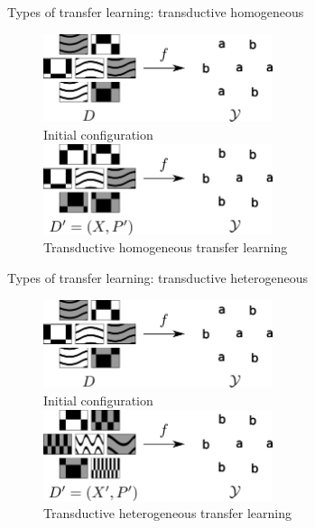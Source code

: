 \documentclass[xcolor=pdftex,dvipsnames,table,mathserif]{beamer}
\begin{document}
\begin{frame}{Types of transfer learning: transductive homogeneous}

\begin{figure}[ht]
  \centering
  \includegraphics[width=0.6\textwidth]{tl_0}\\
  Initial configuration\\
  \vspace{2em}
  \includegraphics[width=0.6\textwidth]{tl_transductive_homo}\\
  Transductive homogeneous transfer learning
\end{figure}


\end{frame}

\begin{frame}{Types of transfer learning: transductive heterogeneous}

\begin{figure}[ht]
  \centering
  \includegraphics[width=0.6\textwidth]{tl_0}\\
  Initial configuration\\
  \vspace{2em}
  \includegraphics[width=0.6\textwidth]{tl_transductive_hete}\\
  Transductive heterogeneous transfer learning
\end{figure}

\end{frame}
\end{document}
